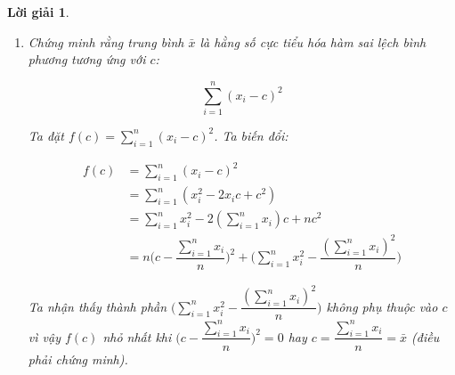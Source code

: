 \documentclass[14pt, a4paper]{article}
\theoremstyle{sltheorem}
\theoremstyle{soltheorem}
\newtheorem*{loigiai}{Lời giải}
\begin{document}
\begin{loigiai}
\begin{enumerate}[wide, labelwidth=!, labelindent=0pt,label=\textbf{\arabic*}.]
\begin{enumerate}
            \item Sử dụng ý a và ý b giải thích $X_{(k)}\approx z_{k/n+1}$
            
            Ta gọi $X$ là biến ngẫu nhiên tuân theo phân bố chuẩn tắc $\mathcal{N}(0;1)$.
            Do đã được chứng minh ở ý a $X \sim \mathcal{N}(0;1)$ thì $\Phi(X) \sim U \lbrack 0; 1\rbrack$.

            Mặt khác, giả sử ta lấy mẫu $n$ điểm thì $\mathbb{E}(\Phi(X_{(k)})) = \dfrac{k}{n+1}$ (đã được chứng minh ở ý b).
            Vậy nên:

            \begin{equation*}
                \begin{aligned}
                    \mathbb{E} (P(X < X_{(k)})) = \mathbb{E} (\Phi(X_{(k)})) = \dfrac{k}{n+1}
                \end{aligned}
            \end{equation*}

            Theo định nghĩa phân vị mức: $P(X < z_q)=\Phi(z_q)=q$ và khi ta lấy mẫu một số lần đủ lớn thì $X_{(k)} \approx z_{k/n+1}$(điều phải chứng minh).
        \end{enumerate}

        \item Chứng minh rằng trung bình $\bar{x}$ là hằng số cực tiểu hóa hàm sai lệch bình phương tương ứng với $c$:

        \begin{equation*}
            \sum_{i=1}^n (x_i - c)^2
        \end{equation*}

        Ta đặt $f(c) = \sum_{i=1}^n (x_i - c)^2$. Ta biến đổi:

        \begin{equation*}
            \begin{aligned}
                f(c) &= \sum_{i=1}^n (x_i - c)^2 \\
                &= \sum_{i=1}^n (x_i^2 - 2x_i c + c^2) \\
                &= \sum_{i=1}^n x_i^2 - 2(\sum_{i=1}^n x_i)c + n c^2 \\
                &= n\Bigg(c - \dfrac{\sum_{i=1}^n x_i}{n}\Bigg)^2 + \Bigg(\sum_{i=1}^n x_i^2 - \dfrac{(\sum_{i=1}^n x_i)^2}{n}\Bigg)
            \end{aligned}
        \end{equation*}

        Ta nhận thấy thành phần $\Bigg(\sum_{i=1}^n x_i^2 - \dfrac{(\sum_{i=1}^n x_i)^2}{n}\Bigg)$ không phụ thuộc vào $c$ vì vậy $f(c)$ nhỏ nhất khi $\Bigg(c - \dfrac{\sum_{i=1}^n x_i}{n}\Bigg)^2=0$ hay $c= \dfrac{\sum_{i=1}^n x_i}{n} = \bar{x}$ (điều phải chứng minh).


\end{enumerate}
\end{loigiai}
\end{document}
